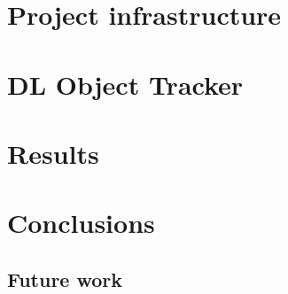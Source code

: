 \documentclass{bmvc2k}
\begin{document}
\section{Project infrastructure}
\section{DL Object Tracker}
\section{Results}
\section{Conclusions}
\subsection{Future work}
{}
\end{document}
